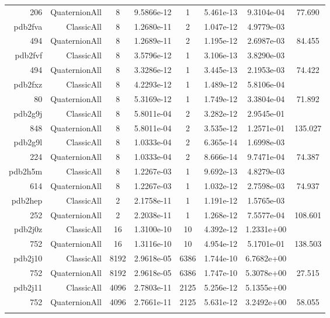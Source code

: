 \begin{xltabular}{\textwidth}{r|rcS[table-format=1.4e+2]cS[table-format=1.3e+2]S[table-format=1.4e+2]S[table-format=-1.3]}
206 & QuaternionAll & 8 & 9.5866e-12 & 1 & 5.461e-13 & 9.3104e-04 & 77.690\\  \addlinespace
pdb2fva & ClassicAll & 8 & 1.2680e-11 & 2 & 1.047e-12 & 4.9779e-03 & \\
494 & QuaternionAll & 8 & 1.2689e-11 & 2 & 1.195e-12 & 2.6987e-03 & 84.455\\  \addlinespace
pdb2fvf & ClassicAll & 8 & 3.5796e-12 & 1 & 3.106e-13 & 3.8290e-03 & \\
494 & QuaternionAll & 8 & 3.3286e-12 & 1 & 3.445e-13 & 2.1953e-03 & 74.422\\  \addlinespace
pdb2fxz & ClassicAll & 8 & 4.2293e-12 & 1 & 1.489e-12 & 5.8106e-04 & \\
80 & QuaternionAll & 8 & 5.3169e-12 & 1 & 1.749e-12 & 3.3804e-04 & 71.892\\  \addlinespace
pdb2g9j & ClassicAll & 8 & 5.8011e-04 & 2 & 3.282e-12 & 2.9545e-01 & \\
848 & QuaternionAll & 8 & 5.8011e-04 & 2 & 3.535e-12 & 1.2571e-01 & 135.027\\  \addlinespace
pdb2g9l & ClassicAll & 8 & 1.0333e-04 & 2 & 6.365e-14 & 1.6998e-03 & \\
224 & QuaternionAll & 8 & 1.0333e-04 & 2 & 8.666e-14 & 9.7471e-04 & 74.387\\  \addlinespace
pdb2h5m & ClassicAll & 8 & 1.2267e-03 & 1 & 9.692e-13 & 4.8279e-03 & \\
614 & QuaternionAll & 8 & 1.2267e-03 & 1 & 1.032e-12 & 2.7598e-03 & 74.937\\  \addlinespace
pdb2hep & ClassicAll & 2 & 2.1758e-11 & 1 & 1.191e-12 & 1.5765e-03 & \\
252 & QuaternionAll & 2 & 2.2038e-11 & 1 & 1.268e-12 & 7.5577e-04 & 108.601\\  \addlinespace
pdb2j0z & ClassicAll & 16 & 1.3100e-10 & 10 & 4.392e-12 & 1.2331e+00 & \\
752 & QuaternionAll & 16 & 1.3116e-10 & 10 & 4.954e-12 & 5.1701e-01 & 138.503\\  \addlinespace
pdb2j10 & ClassicAll & 8192 & 2.9618e-05 & 6386 & 1.744e-10 & 6.7682e+00 & \\
752 & QuaternionAll & 8192 & 2.9618e-05 & 6386 & 1.747e-10 & 5.3078e+00 & 27.515\\  \addlinespace
pdb2j11 & ClassicAll & 4096 & 2.7803e-11 & 2125 & 5.256e-12 & 5.1355e+00 & \\
752 & QuaternionAll & 4096 & 2.7661e-11 & 2125 & 5.631e-12 & 3.2492e+00 & 58.055\\  \addlinespace

\end{xltabular}
